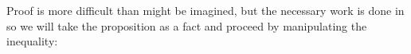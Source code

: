 
  \indent Proof is more difficult than might be imagined, but
the necessary work is done in \cite{BufferStockTheory} so we will take
the proposition as a fact and proceed by manipulating the inequality:

